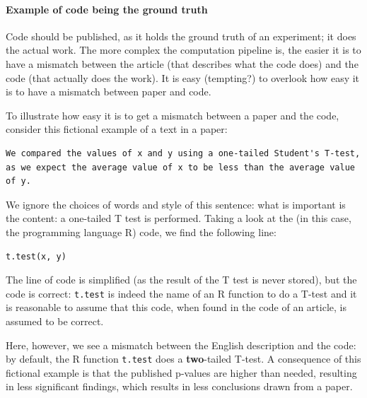 \paragraph{Example of code being the ground truth}

Code should be published, as it holds the
ground truth of an experiment; it does the actual work.
The more complex the computation pipeline is, the easier it is
to have a mismatch between the article (that describes what the
code does) and the code (that actually does the work).
It is easy (tempting?) to overlook how easy it is to have a mismatch
between paper and code.

To illustrate how easy it is to get a mismatch between a paper
and the code, consider this fictional example
of a text in a paper:

\begin{verbatim}
We compared the values of x and y using a one-tailed Student's T-test,
as we expect the average value of x to be less than the average value of y.
\end{verbatim}

We ignore the choices of words and style of this sentence: what is
important is the content: a one-tailed T test is performed.
Taking a look at the (in this case, the programming language R) code, 
we find the following line:

\begin{verbatim}
t.test(x, y)
\end{verbatim}

The line of code is simplified (as the result of the T test is never stored),
but the code is correct:
\verb|t.test| is indeed the name of an R function to do a T-test
and it is reasonable to assume that this code, when found in the code
of an article, is assumed to be correct.

Here, however, we see a mismatch between the English description and the code:
by default, the R function \verb|t.test| does a \textbf{two}-tailed T-test.
A consequence of this fictional example is that the published p-values are
higher than needed, resulting in less significant findings, which
results in less conclusions drawn from a paper.

